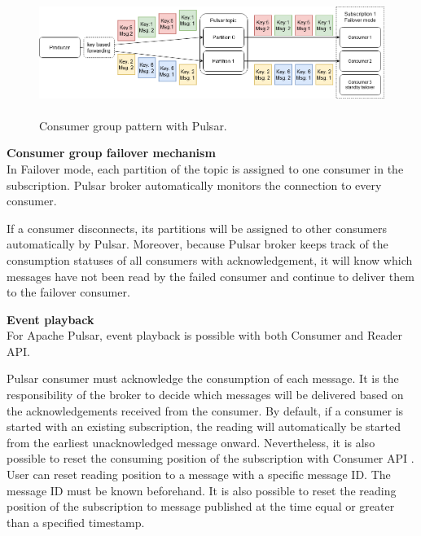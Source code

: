 \begin{figure}[h]
	\centering
	\includegraphics[width=\linewidth,height=4cm]{images/consumer-group-pulsar.png}
	\caption{Consumer group pattern with Pulsar.}
	\label{fig:pulsarconsumergroup}
\end{figure}

\textbf{Consumer group failover mechanism}\\
In Failover mode, each partition of the topic is assigned to one consumer in the subscription. Pulsar broker automatically monitors the connection to every consumer. 

If a consumer disconnects, its partitions will be assigned to other consumers automatically by Pulsar. Moreover, because Pulsar broker keeps track of the consumption statuses of all consumers with acknowledgement, it will know which messages have not been read by the failed consumer and continue to deliver them to the failover consumer.

\textbf{Event playback}\\
For Apache Pulsar, event playback is possible with both Consumer and Reader API.

Pulsar consumer must acknowledge the consumption of each message. It is the responsibility of the broker to decide which messages will be delivered based on the acknowledgements received from the consumer. By default, if a consumer is started with an existing subscription, the reading will automatically be started from the earliest unacknowledged message onward. Nevertheless, it is also possible to reset the consuming position of the subscription with Consumer API \cite{pulsarconsumerapi}. User can reset reading position to a message with a specific message ID. The message ID must be known beforehand. It is also possible to reset the reading position of the subscription to message published at the time equal or greater than a specified timestamp. 

